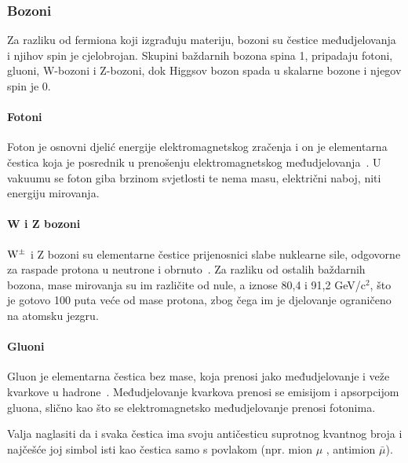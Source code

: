 \documentclass[12pt,a4paper,oneside]{article}
\begin{document}
\begin{linenumbers}
		\subsubsection{Bozoni}
		Za razliku od fermiona koji izgrađuju materiju, bozoni su čestice međudjelovanja i njihov spin je cjelobrojan. Skupini baždarnih bozona spina 1, pripadaju fotoni, gluoni, W-bozoni i Z-bozoni, dok Higgsov bozon spada u skalarne bozone i njegov spin je 0.
		
		\paragraph{Fotoni\newline}
		Foton je osnovni djelić energije elektromagnetskog zračenja i on je elementarna čestica koja je posrednik u prenošenju elektromagnetskog međudjelovanja~\cite{uvod3}. U vakuumu se foton giba brzinom svjetlosti te nema masu, električni naboj, niti energiju mirovanja.
		\paragraph{W i Z bozoni\newline}
		$\rm{W}^{\pm}$ i Z bozoni su elementarne čestice prijenosnici slabe nuklearne sile, odgovorne za raspade protona u neutrone i obrnuto~\cite{uvod4}. Za razliku od ostalih baždarnih bozona, mase mirovanja su im različite od nule, a iznose 80,4 i 91,2 GeV/c$^2$, što je gotovo 100 puta veće od mase protona, zbog čega im je djelovanje ograničeno na atomsku jezgru.
		\paragraph{Gluoni\newline}
		Gluon  je elementarna čestica bez mase, koja prenosi jako međudjelovanje i veže kvarkove u hadrone~\cite{uvod5}. Međudjelovanje kvarkova prenosi se emisijom i apsorpcijom gluona, slično kao što se elektromagnetsko međudjelovanje prenosi fotonima. 
		
		
		Valja naglasiti da i svaka čestica ima svoju antičesticu suprotnog kvantnog broja i najčešće joj simbol isti kao čestica samo s povlakom (npr. mion $\mu$ , antimion \begin{math}
		\bar{\mu}
		\end{math}).
		
		

\end{linenumbers}
\end{document}
